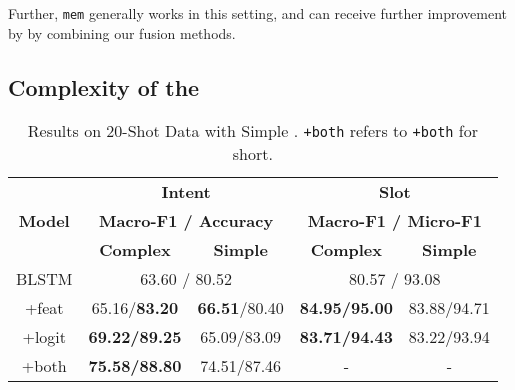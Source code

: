 Further, \texttt{mem} generally works in this setting, and can receive further improvement by 
by combining our fusion methods.

\subsection{Complexity of the \RE}
\label{sec_complexity}
\begin{table}
\setlength{\tabcolsep}{0.23em}
\centering
\small{
\begin{tabular}{|c|c|c|c|c|}

\hline
\multirow{3}{*}{\textbf{Model}}  & \multicolumn{2}{|c|}{\textbf{Intent}} & \multicolumn{2}{|c|}{\textbf{Slot}}  \\
\cline{2-5}
  & \multicolumn{2}{|c|}{\textbf{Macro-F1 / Accuracy}} & \multicolumn{2}{|c|}{\textbf{Macro-F1 / Micro-F1}}  \\
\cline{2-5}
  & \textbf{Complex} & \textbf{Simple} & \textbf{Complex} & \textbf{Simple} \\
\hline
\rowcolor{Gray} BLSTM & \multicolumn{2}{|c|}{63.60 / 80.52} & \multicolumn{2}{|c|}{80.57 / 93.08}  \\
\hline
+feat & 65.16/\textbf{83.20} & \textbf{66.51}/80.40 & \textbf{84.95/95.00} & 83.88/94.71 \\
\hline
\rowcolor{Gray} +logit & \textbf{69.22/89.25} & 65.09/83.09 & \textbf{83.71/94.43} & 83.22/93.94  \\
\hline
+both & \textbf{75.58/88.80} & 74.51/87.46 & - & - \\
\hline
\end{tabular}
}
\caption{Results on 20-Shot Data with Simple \REs. \texttt{+both} refers to \ptatt\texttt{+both} for short.}
\label{tab_simple}
\end{table}

